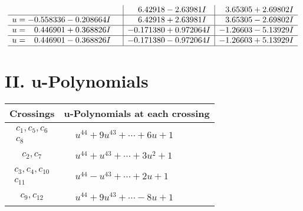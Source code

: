 \documentclass[1p]{elsarticle_modified}
\theoremstyle{definition}
\begin{document}
$$\begin{array}{c|c|c}
 & \phantom{-}6.42918 - 2.63981 I & \phantom{-}3.65305 + 2.69802 I \\ \hline\begin{aligned}
u &= -0.558336 - 0.208664 I\end{aligned}
 & \phantom{-}6.42918 + 2.63981 I & \phantom{-}3.65305 - 2.69802 I \\ \hline\begin{aligned}
u &= \phantom{-}0.446901 + 0.368826 I\end{aligned}
 & -0.171380 + 0.972064 I & -1.26603 - 5.13929 I \\ \hline\begin{aligned}
u &= \phantom{-}0.446901 - 0.368826 I\end{aligned}
 & -0.171380 - 0.972064 I & -1.26603 + 5.13929 I\\
 \hline 
 \end{array}$$\newpage
\newpage\renewcommand{\arraystretch}{1}
\centering \section*{ II. u-Polynomials}
\begin{tabular}{m{50pt}|m{274pt}}
Crossings & \hspace{64pt}u-Polynomials at each crossing \\
\hline $$\begin{aligned}c_{1},c_{5},c_{6}\\c_{8}\end{aligned}$$&$\begin{aligned}
&u^{44}+9 u^{43}+\cdots+6 u+1
\end{aligned}$\\
\hline $$\begin{aligned}c_{2},c_{7}\end{aligned}$$&$\begin{aligned}
&u^{44}+u^{43}+\cdots+3 u^2+1
\end{aligned}$\\
\hline $$\begin{aligned}c_{3},c_{4},c_{10}\\c_{11}\end{aligned}$$&$\begin{aligned}
&u^{44}- u^{43}+\cdots+2 u+1
\end{aligned}$\\
\hline $$\begin{aligned}c_{9},c_{12}\end{aligned}$$&$\begin{aligned}
&u^{44}+9 u^{43}+\cdots-8 u+1
\end{aligned}$\\
\hline
\end{tabular}\newpage\renewcommand{\arraystretch}{1}
\end{document}
